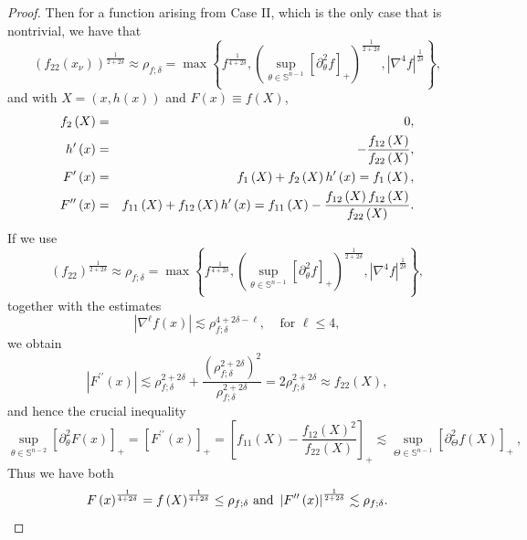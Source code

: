 \documentclass{amsart}
\theoremstyle{plain}
\numberwithin{equation}{section}
\begin{document}
\begin{proof}
Then for a function arising from Case II, which is the only case that is
nontrivial, we have that 
\begin{equation*}
\left( f_{22}\left( x_{\nu }\right) \right) ^{\frac{1}{2+2\delta }}\approx
\rho _{f;\delta}=\max \left\{ f^{\frac{1}{4+2\delta }},\left( \sup_{\theta \in 
\mathbb{S}^{n-1}}\left[ \partial _{\theta }^{2}f\right] _{+}\right) ^{\frac{1%
}{2+2\delta }},\left\vert \nabla ^{4}f\right\vert ^{\frac{1}{2\delta }%
}\right\} ,
\end{equation*}%
and with $X=\left( x,h\left( x\right) \right) $ and $F\left( x\right) \equiv
f\left( X\right) $,%
\begin{eqnarray}
f_{2}\left( X\right)  &=&0,  \label{F''} \\
h^{\prime }\left( x\right)  &=&-\frac{f_{12}\left( X\right) }{f_{22}\left(
X\right) },  \notag \\
F^{\prime }\left( x\right)  &=&f_{1}\left( X\right) +f_{2}\left( X\right)
h^{\prime }\left( x\right) =f_{1}\left( X\right) ,  \notag \\
F^{\prime \prime }\left( x\right)  &=&f_{11}\left( X\right) +f_{12}\left(
X\right) h^{\prime }\left( x\right) =f_{11}\left( X\right) -\frac{%
f_{12}\left( X\right) f_{12}\left( X\right) }{f_{22}\left( X\right) }. 
\notag
\end{eqnarray}%
If we use 
\begin{equation*}
\left( f_{22}\right) ^{\frac{1}{2+2\delta }}\approx \rho _{f;\delta }=\max
\left\{ f^{\frac{1}{4+2\delta }},\left( \sup_{\theta \in \mathbb{S}^{n-1}}%
\left[ \partial _{\theta }^{2}f\right] _{+}\right) ^{\frac{1}{2+2\delta }%
},\left\vert \nabla ^{4}f\right\vert ^{\frac{1}{2\delta }}\right\} ,
\end{equation*}%
together with the estimates 
\begin{equation*}
\left\vert \nabla ^{\ell }f\left( x\right) \right\vert \lesssim \rho
_{f;\delta }^{4+2\delta -\ell },\ \ \ \ \ \text{for }\ell \leq 4,
\end{equation*}%
we obtain%
\begin{equation*}
\left\vert F^{\prime \prime }\left( x\right) \right\vert \lesssim \rho
_{f;\delta }^{2+2\delta }+\frac{\left( \rho _{f;\delta }^{2+2\delta }\right)
^{2}}{\rho _{f;\delta }^{2+2\delta }}=2\rho _{f;\delta }^{2+2\delta }\approx
f_{22}\left( X\right) ,
\end{equation*}%
and hence the crucial inequality%
\begin{equation}
\sup_{\theta \in \mathbb{S}^{n-2}}\left[ \partial _{\theta }^{2}F\left(
x\right) \right] _{+}=\left[ F^{\prime \prime }\left( x\right) \right] _{+}=%
\left[ f_{11}\left( X\right) -\frac{f_{12}\left( X\right) ^{2}}{f_{22}\left(
X\right) }\right] _{+}\lesssim \sup_{\Theta \in \mathbb{S}^{n-1}}\left[
\partial _{\Theta }^{2}f\left( X\right) \right] _{+}\ ,  \label{crucial}
\end{equation}%
Thus we have both 
\begin{equation}
F\left( x\right) ^{\frac{1}{4+2\delta }}=f\left( X\right) ^{\frac{1}{%
4+2\delta }}\leq \rho _{f;\delta }\text{ and }\left\vert F^{\prime \prime
}\left( x\right) \right\vert ^{\frac{1}{2+2\delta }}\lesssim \rho _{f;\delta
}.  \label{have both}
\end{equation}


\end{proof}
\end{document}
